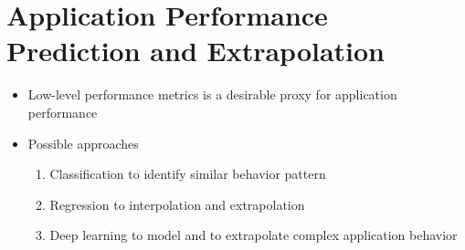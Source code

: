 \section{Application Performance Prediction and Extrapolation}
\label{sec:prediction}


\begin{itemize}
  \item Low-level performance metrics is a desirable proxy for application performance
  \item Possible approaches
  	\begin{enumerate}
  	  \item Classification to identify similar behavior pattern
  	  \item Regression to interpolation and extrapolation
  	  \item Deep learning to model and to extrapolate complex application behavior
  	\end{enumerate}
\end{itemize}
